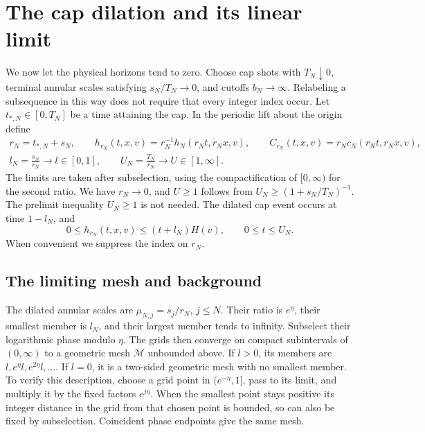 \section{The cap dilation and its linear limit}\label{sec:dilation}

We now let the physical horizons tend to zero. Choose cap shots with
\(T_N\downarrow0\), terminal annular scales satisfying
\(s_N/T_N\to0\), and cutoffs \(b_N\to\infty\). Relabeling a
subsequence in this way does not require that every integer index occur.
Let \(t_{*,N}\in[0,T_N]\) be a time attaining the cap. In the periodic
lift about the origin define
\begin{equation}\label{eq:rescaling}
\begin{gathered}
r_N=t_{*,N}+s_N,\qquad
h_{r_N}(t,x,v)=r_N^{-1}h_N(r_Nt,r_Nx,v),\qquad
C_{r_N}(t,x,v)=r_Nc_N(r_Nt,r_Nx,v),\\
l_N=\frac{s_N}{r_N}\longrightarrow l\in[0,1],\qquad
U_N=\frac{T_N}{r_N}\longrightarrow U\in[1,\infty].
\end{gathered}
\end{equation}
The limits are taken after subselection, using the compactification of
\([0,\infty)\) for the second ratio. We have \(r_N\to0\), and
\(U\geq1\) follows from
\(U_N\geq(1+s_N/T_N)^{-1}\). The prelimit inequality \(U_N\geq1\)
is not needed. The dilated cap event occurs at time \(1-l_N\), and
\begin{equation}\label{dil:cap-bound}
0\leq h_{r_N}(t,x,v)\leq(t+l_N)H(v),
\qquad 0\leq t\leq U_N.
\end{equation}
When convenient we suppress the index on \(r_N\).

\subsection{The limiting mesh and background}

The dilated annular scales are \(\mu_{N,j}=s_j/r_N\), \(j\leq N\).
Their ratio is \(e^\eta\), their smallest member is \(l_N\), and
their largest member tends to infinity. Subselect their logarithmic
phase modulo \(\eta\). The grids then converge on compact
subintervals of \((0,\infty)\) to a geometric mesh \(\mathcal M\)
unbounded above. If \(l>0\), its members are
\(l,e^\eta l,e^{2\eta}l,\ldots\). If \(l=0\), it is a two-sided
geometric mesh with no smallest member. To verify this description,
choose a grid point in \((e^{-\eta},1]\), pass to its limit, and
multiply it by the fixed factors \(e^{j\eta}\). When the smallest
point stays positive its integer distance in the grid from that chosen
point is bounded, so can also be fixed by subselection. Coincident phase
endpoints give the same mesh.

